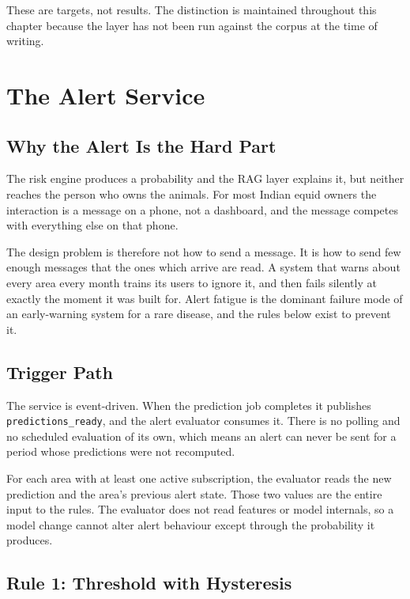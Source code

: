 \documentclass[10pt,openany]{report}
\begin{document}
These are targets, not results. The distinction is maintained throughout this chapter because the
layer has not been run against the corpus at the time of writing.

\chapter{The Alert Service}
\label{ch:alerts}

\section{Why the Alert Is the Hard Part}

The risk engine produces a probability and the RAG layer explains it, but neither reaches the
person who owns the animals. For most Indian equid owners the interaction is a message on a phone,
not a dashboard, and the message competes with everything else on that phone.

The design problem is therefore not how to send a message. It is how to send few enough messages
that the ones which arrive are read. A system that warns about every area every month trains its
users to ignore it, and then fails silently at exactly the moment it was built for. Alert fatigue
is the dominant failure mode of an early-warning system for a rare disease, and the rules below
exist to prevent it.

\section{Trigger Path}

The service is event-driven. When the prediction job completes it publishes
\texttt{predictions\_ready}, and the alert evaluator consumes it. There is no polling and no
scheduled evaluation of its own, which means an alert can never be sent for a period whose
predictions were not recomputed.



For each area with at least one active subscription, the evaluator reads the new prediction and the
area's previous alert state. Those two values are the entire input to the rules. The evaluator does
not read features or model internals, so a model change cannot alter alert behaviour except through
the probability it produces.

\section{Rule 1: Threshold with Hysteresis}
\end{document}
